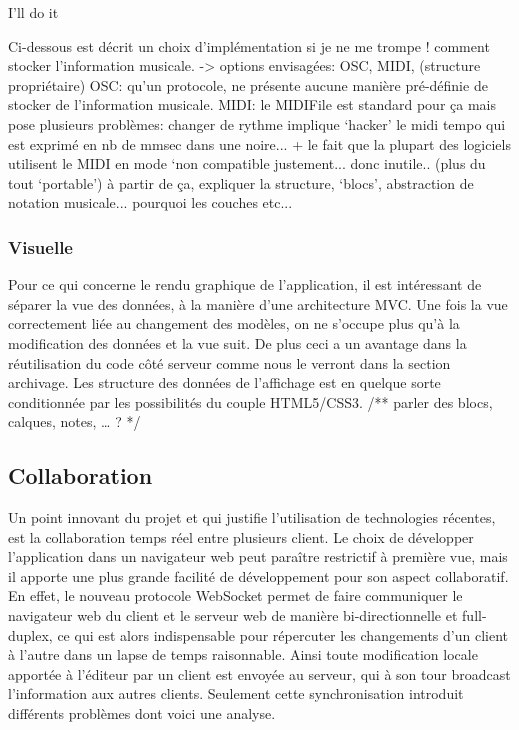 \documentclass[pdftex,12pt,a4paper]{article}
\begin{document}
I’ll do it

Ci-dessous est décrit un choix d’implémentation si je ne me trompe !
comment stocker l’information musicale.
-> options envisagées: OSC, MIDI, (structure propriétaire)
OSC: qu’un protocole, ne présente aucune manière pré-définie de stocker de l’information musicale.
MIDI: le MIDIFile est standard pour ça mais pose plusieurs problèmes: changer de rythme implique ‘hacker’ le midi tempo qui est exprimé en nb de mmsec dans une noire...
+ le fait que la plupart des logiciels utilisent le MIDI en mode ‘non compatible justement... donc inutile.. (plus du tout ‘portable’)
à partir de ça, expliquer la structure, ‘blocs’, abstraction de notation musicale... pourquoi les couches etc...

\subsubsection{Visuelle}

Pour ce qui concerne le rendu graphique de l’application, il est intéressant de séparer la vue des données, à la manière d’une architecture MVC. Une fois la vue correctement liée au changement des modèles, on ne s’occupe plus qu’à la modification des données et la vue suit. De plus ceci a un avantage dans la réutilisation du code côté serveur comme nous le verront dans la section archivage.
Les structure des données de l’affichage est en quelque sorte conditionnée par les possibilités du couple HTML5/CSS3.
/** parler des blocs, calques, notes, … ? */

\subsection{Collaboration}

Un point innovant du projet et qui justifie l’utilisation de technologies récentes, est la collaboration temps réel entre plusieurs client. Le choix de développer l’application dans un navigateur web peut paraître restrictif à première vue, mais il apporte une plus grande facilité de développement pour son aspect collaboratif.
En effet, le nouveau protocole WebSocket permet de faire communiquer le navigateur web du client et le serveur web de manière bi-directionnelle et full-duplex, ce qui est alors indispensable pour répercuter les changements d’un client à l’autre dans un lapse de temps raisonnable. Ainsi toute modification locale apportée à l’éditeur par un client est envoyée au serveur, qui à son tour broadcast l’information aux autres clients.
Seulement cette synchronisation introduit différents problèmes dont voici une analyse.
\end{document}
